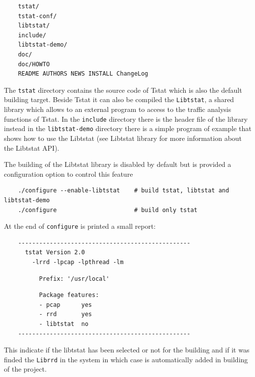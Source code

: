 \documentclass[11pt]{article}
\begin{document}
\begin{small}\begin{verbatim}
    tstat/
    tstat-conf/
    libtstat/
    include/
    libtstat-demo/
    doc/ 
    doc/HOWTO
    README AUTHORS NEWS INSTALL ChangeLog
\end{verbatim}\end{small} \noindent
The \texttt{tstat} directory contains the source code of Tstat which
is also the default building target. Beside Tstat it can also be compiled
the \texttt{Libtstat}, a shared library which allows to an external program to access 
to the traffic analysis functions of Tstat. In the \texttt{include} directory there is the
header file of the library instead in the \texttt{libtstat-demo} directory there is a simple 
program of example that shows how to use the Libtstat 
(see \textsf{Libtstat library} for more information about the Libtstat API).



The building of the Libtstat library is disabled by default but is provided
a configuration option to control this feature

\begin{small}\begin{verbatim}
    ./configure --enable-libtstat    # build tstat, libtstat and libtstat-demo
    ./configure                      # build only tstat
\end{verbatim}\end{small} \noindent
At the end of \texttt{configure} is printed a small report:

\begin{small}\begin{verbatim}
    -------------------------------------------------
      tstat Version 2.0
        -lrrd -lpcap -lpthread -lm
\end{verbatim}\end{small} \noindent
\begin{small}\begin{verbatim}
          Prefix: '/usr/local'
\end{verbatim}\end{small} \noindent
\begin{small}\begin{verbatim}
          Package features:
          - pcap      yes
          - rrd       yes
          - libtstat  no
    -------------------------------------------------
\end{verbatim}\end{small} \noindent
This indicate if the libtstat has been selected or not for the building 
and if it was finded the \texttt{Librrd} in the system in which case is automatically
added in building of the project.
\end{document}
